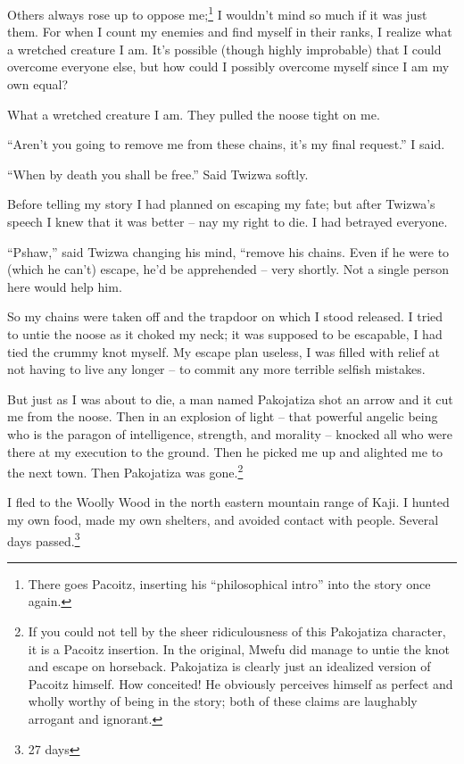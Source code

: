 Others always rose up to oppose me;\footnote{There goes Pa\-co\-itz, inserting his ``philosophical intro'' into the story once again.}
I wouldn't mind so much if it was just them.
For when I count my enemies and find myself in their ranks, I realize what a wretched creature I am.
It's possible (though highly improbable) that I could overcome everyone else, but how could I possibly overcome myself since I am my own equal?

What a wretched creature I am. They pulled the noose tight on me.

``Aren't you going to remove me from these chains, it's my final request.'' I said.

``When by death you shall be free.'' Said Twi\-zwa softly.

Before telling my story I had planned on escaping my fate; but after Twi\-zwa's speech I knew that it was better -- nay my right to die. I had betrayed everyone.

``Pshaw,'' said Twi\-zwa changing his mind, ``remove his chains. Even if he were to (which he can't) escape, he'd be apprehended -- very shortly. Not a single person here would help him.

So my chains were taken off and the trapdoor on which I stood released. I tried to untie the noose as it choked my neck; it was supposed to be escapable, I had tied the crummy knot myself. My escape plan useless, I was filled with relief at not having to live any longer -- to commit any more terrible selfish mistakes.

But just as I was about to die, a man named Pakojatiza shot an arrow and it cut me from the noose. Then in an explosion of light -- that powerful angelic being who is the paragon of intelligence, strength, and morality -- knocked all who were there at my execution to the ground. Then he picked me up and alighted me to the next town. Then Pakojatiza was gone.\footnote{If you could not tell by the sheer ridiculousness of this Pakojatiza character, it is a Pa\-co\-itz insertion. In the original, Mwe\-fu did manage to untie the knot and escape on horseback. Pakojatiza is clearly just an idealized version of Pa\-co\-itz himself. How conceited! He obviously perceives himself as perfect and wholly worthy of being in the story; both of these claims are laughably arrogant and ignorant.}

I fled to the Woolly Wood in the north eastern mountain range of Ka\-ji. I hunted my own food, made my own shelters, and avoided contact with people. Several days passed.\footnote{27 days}

